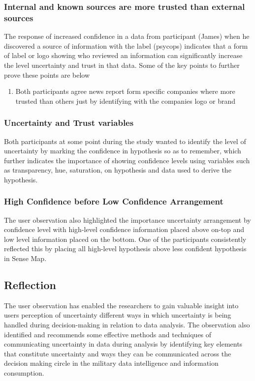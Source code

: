 \documentclass[journal]{vgtc}                %
\begin{document}
\subsubsection{Internal and known sources are more trusted than external sources}
The response of increased confidence in a data from participant (James) when he discovered a source of information with the label (psycops) indicates that a form of label or logo showing who reviewed an information can significantly increase the level uncertainty and trust in that data. Some of the key points to further prove these points are below
\begin{enumerate}
  \item Both participants agree news report form specific companies where more trusted than others just by identifying with the companies logo or brand
\end{enumerate}

\subsubsection{Uncertainty and Trust variables}
Both participants at some point during the study wanted to identify the level of uncertainty by marking the confidence in hypothesis so as to remember, which further indicates the importance of showing confidence levels using variables such as transparency, hue, saturation, on hypothesis and data used to derive the hypothesis. 

\subsubsection{High Confidence before Low Confidence Arrangement }
The user observation also highlighted the importance uncertainty arrangement by confidence level with high-level confidence information placed above on-top and low level information placed on the bottom. One of the participants consistently reflected this by placing all high-level hypothesis above less confident hypothesis in Sense Map. 

\subsection{Reflection}
The user observation has enabled the researchers to gain valuable insight into users perception of uncertainty different ways in which uncertainty is being handled during decision-making in relation to data analysis. The observation also identified and recommends some effective methods and techniques of communicating uncertainty in data during analysis by identifying key elements that constitute uncertainty and ways they can be communicated across the decision making circle in the military data intelligence and information consumption. 
\end{document}
